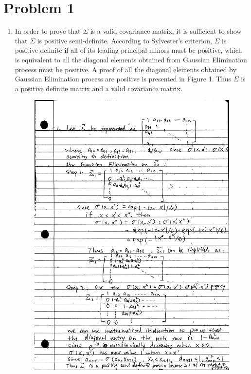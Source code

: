 \documentclass{article}
\begin{document}
\section{Problem 1}
\begin{enumerate}
\item
    In order to prove that $\Sigma$ is a valid covariance matrix, it is sufficient to show that $\Sigma$ is positive semi-definite. According to Sylvester's criterion, $\Sigma$ is positive definite if all of its leading principal minors must be positive, which is equivalent to all the diagonal elements obtained from Gaussian Elimination process must be positive. A proof of all the diagonal elements obtained by Gaussian Elimination process are positive is presented in Figure 1. Thus $\Sigma$ is a positive definite matrix and a valid covariance matrix.
    \begin{figure}[h]
        \includegraphics[width=1.0\linewidth]{fir.png}

\end{figure}
\end{enumerate}
\end{document}
